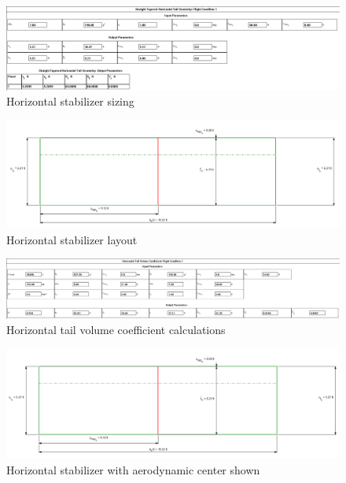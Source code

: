 \documentclass[conf]{new-aiaa}
\begin{document}
\begin{figure}[H]
    \includegraphics[width=\textwidth]{Report3Printouts/Empannage/Horizontal_geometry_cropped.png}
    \caption{Horizontal stabilizer sizing}
    \label{fig:horizontal_geometry}
\end{figure}

\begin{figure}[H]
    \includegraphics[width=\textwidth]{Report3Printouts/Empannage/Horizontal_geometry_plot.png}
    \caption{Horizontal stabilizer layout}
    \label{fig:horizontal_geometry_plot}
\end{figure}

\begin{figure}[H]
    \includegraphics[width=\textwidth]{Report3Printouts/Empannage/Horizontal_volumeratio_cropped.png}
    \caption{Horizontal tail volume coefficient calculations}
    \label{fig:horizontal_volumeratio}
\end{figure}

\begin{figure}[H]
    \includegraphics[width=\textwidth]{Report3Printouts/Empannage/Horizontal_volumeratio_plot.png}
    \caption{Horizontal stabilizer with aerodynamic center shown}
    \label{fig:horizontal_volumeratio_plot}
\end{figure}
\end{document}

